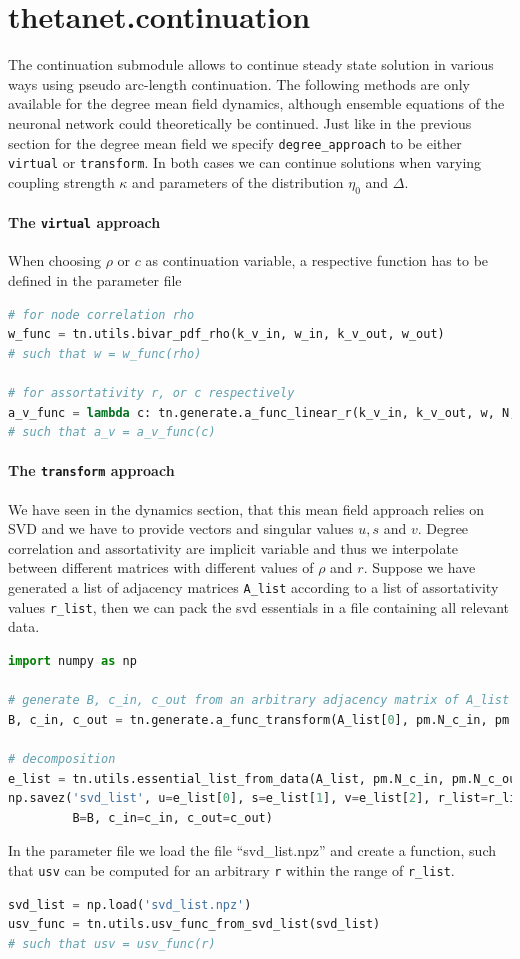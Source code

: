 \documentclass[bibliography=totoc, twoside]{article}
\numberwithin{equation}{section}
\begin{document}
\section{thetanet.continuation}
The continuation submodule allows to continue steady state solution in various ways using pseudo arc-length continuation.
The following methods are only available for the degree mean field dynamics, although ensemble equations of the neuronal network could theoretically be continued.
Just like in the previous section for the degree mean field we specify \texttt{degree\_approach} to be either \texttt{virtual} or \texttt{transform}.
In both cases we can continue solutions when varying coupling strength $\kappa$ and parameters of the distribution $\eta_0$ and $\Delta$.
\paragraph*{The \texttt{virtual} approach} When choosing $\rho$ or $c$ as continuation variable, a respective function has to be defined in the parameter file
\begin{lstlisting}[language=python]
# for node correlation rho
w_func = tn.utils.bivar_pdf_rho(k_v_in, w_in, k_v_out, w_out)
# such that w = w_func(rho)

# for assortativity r, or c respectively
a_v_func = lambda c: tn.generate.a_func_linear_r(k_v_in, k_v_out, w, N, c, i_prop, j_prop)
# such that a_v = a_v_func(c)
\end{lstlisting}

\paragraph*{The \texttt{transform} approach} We have seen in the dynamics section, that this mean field approach relies on SVD and we have to provide vectors and singular values $u, s$ and $v$.
Degree correlation and assortativity are implicit variable and thus we interpolate between different matrices with different values of $\rho$ and $r$.
Suppose we have generated a list of adjacency matrices \texttt{A\_list} according to a list of assortativity values \texttt{r\_list}, then we can pack the svd essentials in a file containing all relevant data.
\begin{lstlisting}[language=python]
import numpy as np

# generate B, c_in, c_out from an arbitrary adjacency matrix of A_list
B, c_in, c_out = tn.generate.a_func_transform(A_list[0], pm.N_c_in, pm.N_c_out)[1:]

# decomposition
e_list = tn.utils.essential_list_from_data(A_list, pm.N_c_in, pm.N_c_out)
np.savez('svd_list', u=e_list[0], s=e_list[1], v=e_list[2], r_list=r_list,
         B=B, c_in=c_in, c_out=c_out)
\end{lstlisting}
In the parameter file we load the file ``svd\_list.npz'' and create a function, such that \texttt{usv} can be computed for an arbitrary \texttt{r} within the range of \texttt{r\_list}.
\begin{lstlisting}[language=python]
svd_list = np.load('svd_list.npz')
usv_func = tn.utils.usv_func_from_svd_list(svd_list)
# such that usv = usv_func(r)
\end{lstlisting}
\end{document}
